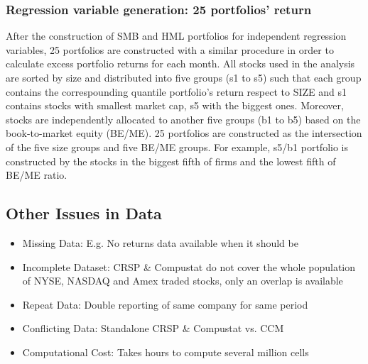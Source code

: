 \documentclass[12pt]{article}
\begin{document}
\subsubsection{Regression variable generation: 25 portfolios' return}
After the construction of SMB and HML portfolios for independent regression variables, 25 portfolios are constructed with a similar procedure in order to calculate excess portfolio returns for each month. All  stocks used in the analysis are sorted by size and distributed into five groups (s1 to s5) such that each group contains the correspounding quantile portfolio's return respect to SIZE and s1 contains stocks with smallest market cap, s5 with the biggest ones. Moreover, stocks are independently allocated to another five groups (b1 to b5) based on the book-to-market equity (BE/ME). 25 portfolios are constructed as the intersection of the five size groups and five BE/ME groups. For example, s5/b1 portfolio is constructed by the stocks in the biggest fifth of firms and the lowest fifth of BE/ME ratio.

\subsection{Other Issues in Data}
\begin{itemize}
	\item Missing Data: E.g. No returns data available when it should be
	\item Incomplete Dataset: CRSP \& Compustat do not cover the whole population of NYSE, NASDAQ and Amex traded stocks, only an overlap is available
	\item Repeat Data: Double reporting of same company for same period
	\item Conflicting Data: Standalone CRSP \& Compustat vs. CCM
	\item Computational Cost: Takes hours to compute several million cells	
\end{itemize}
\newpage
\end{document}
